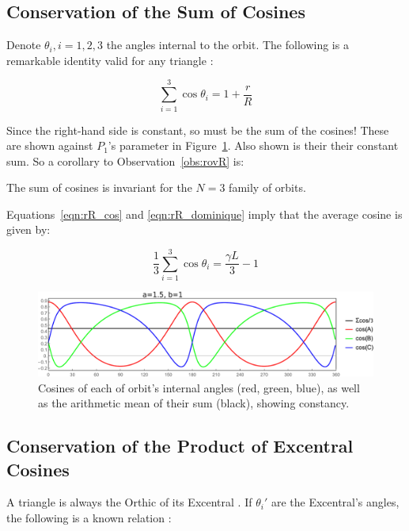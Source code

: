 \subsection{Conservation of the Sum of Cosines}

Denote $\theta_i,i=1,2,3$ the angles internal to the orbit. The following is a remarkable identity valid for any triangle \cite{johnson29}:

\begin{equation}
\sum_{i=1}^{3}{\cos\theta_i}=1+\frac{r}{R}
\label{eqn:rR_cos}
\end{equation}

Since the right-hand side is constant, so must be the sum of the cosines! These are shown against $P_1$'s parameter in Figure~\ref{fig:cosine_sum_n3}. Also shown is their their constant sum. So a corollary to Observation~\ref{obs:rovR} is:

\begin{corollary}
\label{cor8}
The sum of cosines is invariant for the $N=3$ family of orbits. 
\end{corollary}

\noindent Equations~\ref{eqn:rR_cos} and \ref{eqn:rR_dominique} imply
that the average cosine is given by:

\begin{equation}
\frac{1}{3}\sum_{i=1}^{3}{\cos\theta_i}=\frac{\gamma{L}}{3}-1
\label{eqn:rR_cos_avg}
\end{equation}

\begin{figure}[H]
    \centering
    \includegraphics[width=\textwidth]{pics/0090_cosine_sum_n3.pdf}
    \caption{Cosines of each of orbit's internal angles (red, green, blue), as well as the arithmetic mean of their sum (black), showing constancy.}
    \label{fig:cosine_sum_n3}
\end{figure}

\subsection{Conservation of the Product of Excentral Cosines}

A triangle is always the Orthic of its Excentral \cite{mw}. If $\theta_i'$ are the Excentral's angles, the following is a known relation \cite{johnson29}:

